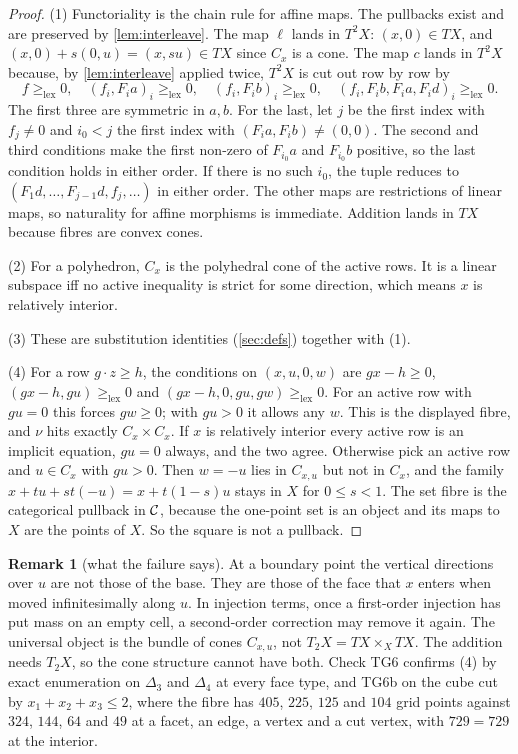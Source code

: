 \documentclass[11pt]{article}
\theoremstyle{definition}\newtheorem{definition}[theorem]{Definition}\newtheorem{remark}[theorem]{Remark}\newtheorem{example}[theorem]{Example}
\newcommand{\lex}{\ge_{\mathrm{lex}}}
\begin{document}
\begin{proof}
(1) Functoriality is the chain rule for affine maps. The pullbacks exist and are preserved by \cref{lem:interleave}. The map $\ell$
lands in $T^2X$: $(x,0)\in TX$, and $(x,0)+s(0,u)=(x,su)\in TX$ since $C_x$ is a cone. The map $c$ lands in $T^2X$ because, by
\cref{lem:interleave} applied twice, $T^2X$ is cut out row by row by
\[
f\lex0,\quad(f_i,F_ia)_i\lex0,\quad(f_i,F_ib)_i\lex0,\quad(f_i,F_ib,F_ia,F_id)_i\lex0 .
\]
The first three are symmetric in $a,b$. For the last, let $j$ be the first index with $f_j\ne0$ and $i_0<j$ the first index with
$(F_ia,F_ib)\ne(0,0)$. The second and third conditions make the first non-zero of $F_{i_0}a$ and $F_{i_0}b$ positive, so the last
condition holds in either order. If there is no such $i_0$, the tuple reduces to $(F_1d,\dots,F_{j-1}d,f_j,\dots)$ in either order.
The other maps are restrictions of linear maps, so naturality for affine morphisms is immediate. Addition lands in $TX$ because fibres
are convex cones.

(2) For a polyhedron, $C_x$ is the polyhedral cone of the active rows. It is a linear subspace iff no active inequality is strict for
some direction, which means $x$ is relatively interior.

(3) These are substitution identities (\cref{sec:defs}) together with (1).

(4) For a row $g\cdot z\ge h$, the conditions on $(x,u,0,w)$ are $gx-h\ge0$, $(gx-h,gu)\lex0$ and $(gx-h,0,gu,gw)\lex0$. For an
active row with $gu=0$ this forces $gw\ge0$; with $gu>0$ it allows any $w$. This is the displayed fibre, and $\nu$ hits exactly
$C_x\times C_x$. If $x$ is relatively interior every active row is an implicit equation, $gu=0$ always, and the two agree. Otherwise
pick an active row and $u\in C_x$ with $gu>0$. Then $w=-u$ lies in $C_{x,u}$ but not in $C_x$, and the family $x+tu+st(-u)=x+t(1-s)u$
stays in $X$ for $0\le s<1$. The set fibre is the categorical pullback in $\mathcal C$, because the one-point set is an object and its maps
to $X$ are the points of $X$. So the square is not a pullback.
\end{proof}

\begin{remark}[what the failure says]
At a boundary point the vertical directions over $u$ are not those of the base. They are those of the face that $x$ enters when moved
infinitesimally along $u$. In injection terms, once a first-order injection has put mass on an empty cell, a second-order correction
may remove it again. The universal object is the bundle of cones $C_{x,u}$, not $T_2X=TX\times_XTX$. The addition needs $T_2X$, so the
cone structure cannot have both. Check TG6 confirms (4) by exact enumeration on $\Delta_3$ and $\Delta_4$ at every face type, and TG6b on
the cube cut by $x_1+x_2+x_3\le2$, where the fibre has $405$, $225$, $125$ and $104$ grid points against $324$, $144$, $64$ and $49$ at a
facet, an edge, a vertex and a cut vertex, with $729=729$ at the interior.
\end{remark}
\end{document}
